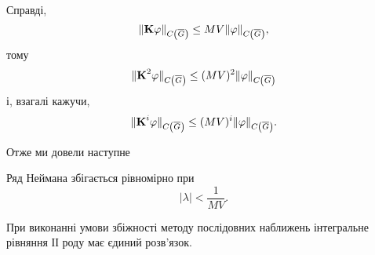 Справді,
\begin{equation}
	\| \textbf{K} \varphi\|_{C\left(\overline{G}\right)} \le MV \|\varphi\|_{C\left(\overline{G}\right)},
\end{equation}
тому
\begin{equation}
	\|\textbf{K}^2\varphi\|_{C\left(\overline{G}\right)} \le (MV)^2 \|\varphi\|_{C\left(\overline{G}\right)}
\end{equation} 
і, взагалі кажучи,
\begin{equation}
	\|\textbf{K}^i\varphi\|_{C\left(\overline{G}\right)} \le (MV)^i \|\varphi\|_{C\left(\overline{G}\right)}.
\end{equation}

Отже ми довели наступне
\begin{proposition}
	Ряд Неймана збігається рівномірно при 	
	\begin{equation}
		|\lambda| < \dfrac{1}{MV}.
	\end{equation} 
\end{proposition}

\begin{lemma}
	При виконанні умови збіжності методу послідовних наближень інтегральне рівняння ІІ роду має єдиний розв'язок.
\end{lemma}


